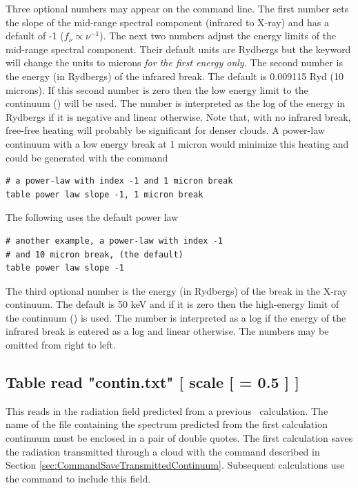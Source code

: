 Three optional numbers may appear on the command line.
The first number
sets the slope of the mid-range spectral component (infrared to X-ray)
and has a default of -1 ($f_\nu   \propto \nu ^{ - 1} $).
The
next two numbers adjust the energy limits of the mid-range spectral
component.
Their default units are Rydbergs but the keyword  will
change the units to microns \emph{for the first energy only.}
The second number
is the energy (in Rydbergs) of the infrared break.
The default is 0.009115
Ryd (10 microns).
If this second number is zero then the low energy limit
to the continuum (\emm ) will be used.
The number is interpreted
as the log of the energy in Rydbergs if it is negative and linear otherwise.
Note that, with no infrared break, free-free heating will probably be
significant for denser clouds.  A power-law continuum with a low energy
break at 1 micron would minimize this heating and could be generated with
the command
\begin{verbatim}
# a power-law with index -1 and 1 micron break
table power law slope -1, 1 micron break
\end{verbatim}
The following uses the default power law
\begin{verbatim}
# another example, a power-law with index -1
# and 10 micron break, (the default)
table power law slope -1
\end{verbatim}

The third optional number is the energy (in Rydbergs) of the break in
the X-ray continuum.
The default is 50 keV and if it is zero then the
high-energy limit of the continuum (\egamry ) is used.
The number is interpreted as a log if the energy of the
infrared break is entered as
a log and linear otherwise.
The numbers may be omitted from right to left.

\subsection{Table read "contin.txt" [ scale [ = 0.5 ] ]}
\label{sec:CommandTableRead}

This reads in the radiation field predicted from
a previous \Cloudy\ calculation.
The name of the file containing the spectrum predicted
from the first calculation continuum must be enclosed
in a pair of double quotes.
The first calculation saves the radiation
transmitted through a cloud with the
 command described in Section
\ref{sec:CommandSaveTransmittedContinuum}.
Subsequent calculations use the  command
to include this field.

